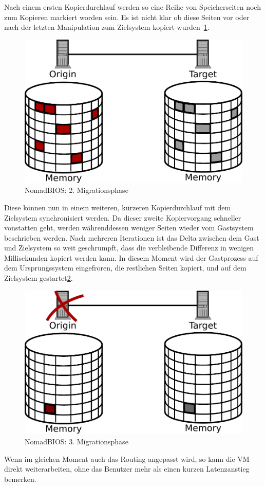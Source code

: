 Nach einem ersten Kopierdurchlauf werden so eine Reihe von
Speicherseiten noch zum Kopieren markiert worden sein. Es ist nicht
klar ob diese Seiten vor oder nach der letzten Manipulation zum
Zielsystem kopiert wurden~\ref{fig:nomad_stage2}.
\begin{figure}[h]
  \centering
  \includegraphics[width=0.7\linewidth]{images/nomad_stage2}
  \caption{NomadBIOS: 2. Migrationsphase}
  \label{fig:nomad_stage2}
\end{figure}
Diese können nun in einem weiteren, kürzeren Kopierdurchlauf mit dem
Zielsystem synchronisiert werden. Da dieser zweite Kopiervorgang
schneller vonstatten geht, werden währenddessen weniger Seiten wieder
vom Gastsystem beschrieben werden. Nach mehreren Iterationen ist das
Delta zwischen dem Gast und Zielsystem so weit geschrumpft, dass die
verbleibende Differenz in wenigen Millisekunden kopiert werden
kann. In diesem Moment wird der Gastprozess auf dem Ursprungssystem
eingefroren, die restlichen Seiten kopiert, und auf dem Zielsystem
gestartet\ref{fig:nomad_stage3}.
\begin{figure}[h]
  \centering
  \includegraphics[width=0.7\linewidth]{images/nomad_stage3}
  \caption{NomadBIOS: 3. Migrationsphase}
  \label{fig:nomad_stage3}
\end{figure}
Wenn im gleichen Moment auch das Routing angepasst wird, so
kann die VM direkt weiterarbeiten, ohne das Benutzer mehr als einen
kurzen Latenzanstieg bemerken.

